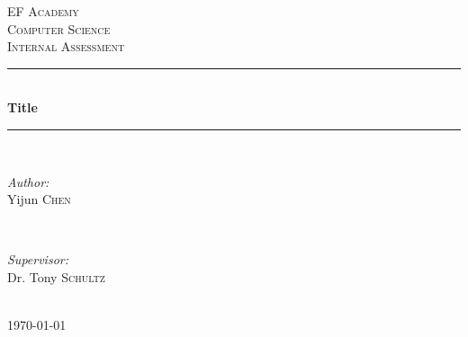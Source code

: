 \documentclass[12pt]{article} %
\begin{document}

\begin{titlepage}

\newcommand{\HRule}{\rule{\linewidth}{0.5mm}} %

\center %

\textsc{\LARGE EF Academy}\\[1.5cm] %
\textsc{\Large Computer Science}\\[0.5cm] %
\textsc{\large Internal Assessment}\\[0.5cm] %

\HRule \\[0.4cm]
{ \huge \bfseries Title}\\[0.4cm] %
\HRule \\[1.5cm]

\begin{minipage}{0.4\textwidth}
\begin{flushleft} \large
\emph{Author:}\\
Yijun \textsc{Chen} %
\end{flushleft}
\end{minipage}
~
\begin{minipage}{0.4\textwidth}
\begin{flushright} \large
\emph{Supervisor:} \\
Dr. Tony \textsc{Schultz} %
\end{flushright}
\end{minipage}\\[4cm]

{\large \today}\\[3cm] %


\vfill %

\end{titlepage}

\end{document}
